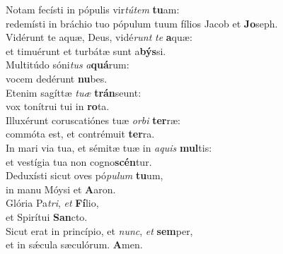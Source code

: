 \evenverse Notam fecísti in pópulis vir\textit{tú}\textit{tem} \textbf{tu}am:~\*\\
\evenverse redemísti in bráchio tuo pópulum tuum fílios Jacob et \textbf{Jo}seph.\\
\oddverse Vidérunt te aquæ, Deus, vidé\textit{runt} \textit{te} \textbf{a}quæ:~\*\\
\oddverse et timuérunt et turbátæ sunt a\textbf{býs}si.\\
\evenverse Multitúdo sóni\textit{tus} \textit{a}\textbf{quá}rum:~\*\\
\evenverse vocem dedérunt \textbf{nu}bes.\\
\oddverse Etenim sagíttæ \textit{tu}\textit{æ} \textbf{trán}seunt:~\*\\
\oddverse vox tonítrui tui in \textbf{ro}ta.\\
\evenverse Illuxérunt coruscatiónes tuæ \textit{or}\textit{bi} \textbf{ter}ræ:~\*\\
\evenverse commóta est, et contrémuit \textbf{ter}ra.\\
\oddverse In mari via tua, et sémitæ tuæ in \textit{a}\textit{quis} \textbf{mul}tis:~\*\\
\oddverse et vestígia tua non cogno\textbf{scén}tur.\\
\evenverse Deduxísti sicut oves pó\textit{pu}\textit{lum} \textbf{tu}um,~\*\\
\evenverse in manu Móysi et \textbf{A}aron.\\
\oddverse Glória Pa\textit{tri}, \textit{et} \textbf{Fí}lio,~\*\\
\oddverse et Spirítui \textbf{San}cto.\\
\evenverse Sicut erat in princípio, et \textit{nunc}, \textit{et} \textbf{sem}per,~\*\\
\evenverse et in sǽcula sæculórum. \textbf{A}men.\\

